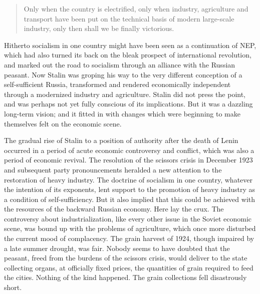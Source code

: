 \begin{quote}
Only when the country is electrified, only when industry, agriculture and transport have been put on the technical basis of modern large-scale industry, only then shall we be finally victorious. 
\end{quote}

Hitherto socialism in one country might have been seen as a continuation of NEP, which had also turned its back on the bleak prospect of international revolution, and marked out the road to socialism through an alliance with the Russian peasant. Now Stalin was groping his way to the very different conception of a self-sufficient Russia, transformed and rendered economically independent through a modernized industry and agriculture. Stalin did not press the point, and was perhaps not yet fully conscious of its implications. But it was a dazzling long-term vision; and it fitted in with changes which were beginning to make themselves felt on the economic scene. 

The gradual rise of Stalin to a position of authority after the death of Lenin occurred in a period of acute economic controversy and conflict, which was also a period of economic revival. The resolution of the scissors crisis in December 1923 and subsequent party pronouncements heralded a new attention to the restoration of heavy industry. The doctrine of socialism in one country, whatever the intention of its exponents, lent support to the promotion of heavy industry as a condition of self-sufficiency. But it also implied that this could be achieved with the resources of the backward Russian economy. Here lay the crux. The controversy about industrialization, like every other issue in the Soviet economic scene, was bound up with the problems of agriculture, which once more disturbed the current mood of complacency. The grain harvest of 1924, though impaired by a late summer drought, was fair. Nobody seems to have doubted that the peasant, freed from the burdens of the scissors crisis, would deliver to the state collecting organs, at officially fixed prices, the quantities of grain required to feed the cities. Nothing of the kind happened. The grain collections fell disastrously short. 


